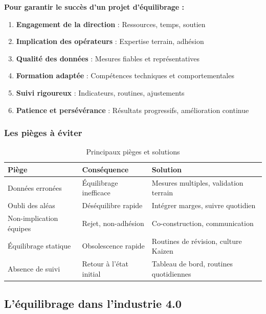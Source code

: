 \documentclass[12pt,a4paper]{article}
\newenvironment{importantnote}
  {\begin{tcolorbox}[colback=blue!5!white, colframe=blue!50!black, title=\textbf{Point Important}]\small}
  {\end{tcolorbox}}
\begin{document}
\begin{center}
\begin{importantnote}
\textbf{Pour garantir le succès d'un projet d'équilibrage :}
\begin{enumerate}
    \item \textbf{Engagement de la direction} : Ressources, temps, soutien
    \item \textbf{Implication des opérateurs} : Expertise terrain, adhésion
    \item \textbf{Qualité des données} : Mesures fiables et représentatives
    \item \textbf{Formation adaptée} : Compétences techniques et comportementales
    \item \textbf{Suivi rigoureux} : Indicateurs, routines, ajustements
    \item \textbf{Patience et persévérance} : Résultats progressifs, amélioration continue
\end{enumerate}
\end{importantnote}

\subsubsection{Les pièges à éviter}

\begin{table}[H]
\centering
\begin{tabular}{|p{4cm}|p{4cm}|p{4cm}|}
\hline
\textbf{Piège} & \textbf{Conséquence} & \textbf{Solution} \\
\hline
Données erronées & Équilibrage inefficace & Mesures multiples, validation terrain \\
\hline
Oubli des aléas & Déséquilibre rapide & Intégrer marges, suivre quotidien \\
\hline
Non-implication équipes & Rejet, non-adhésion & Co-construction, communication \\
\hline
Équilibrage statique & Obsolescence rapide & Routines de révision, culture Kaizen \\
\hline
Absence de suivi & Retour à l'état initial & Tableau de bord, routines quotidiennes \\
\hline
\end{tabular}
\caption{Principaux pièges et solutions}
\end{table}

\subsection{L'équilibrage dans l'industrie 4.0}


\end{center}
\end{document}
